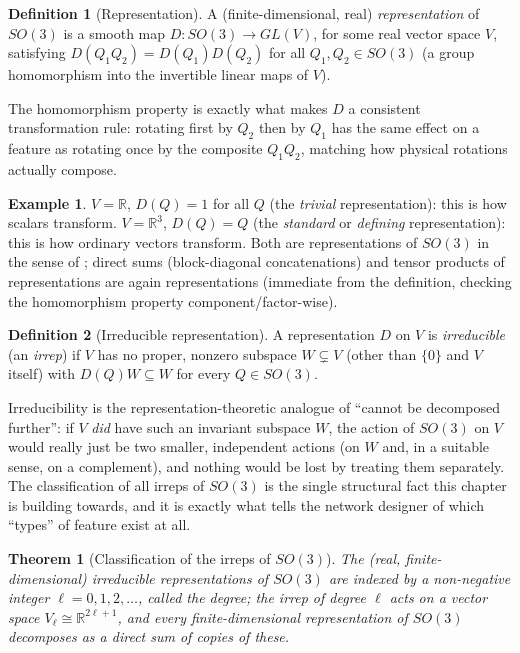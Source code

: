 \documentclass[11pt,a4paper]{report}
\newtheorem{theorem}{Theorem}[chapter]
\theoremstyle{definition}
\newtheorem{definition}[definition]{Definition}
\newtheorem{example}[example]{Example}
\theoremstyle{remark}
\newcommand{\RR}{\mathbb R}
\begin{document}
\begin{definition}[Representation]
\label{def:representation-scratch}
A (finite-dimensional, real) \emph{representation} of $SO(3)$ is a smooth
map $D:SO(3)\to GL(V)$, for some real vector space $V$, satisfying
$D(Q_1Q_2)=D(Q_1)D(Q_2)$ for all $Q_1,Q_2\in SO(3)$ (a group homomorphism
into the invertible linear maps of $V$).
\end{definition}

The homomorphism property is exactly what makes $D$ a consistent
transformation rule: rotating first by $Q_2$ then by $Q_1$ has the same
effect on a feature as rotating once by the composite $Q_1Q_2$, matching
how physical rotations actually compose.

\begin{example}
$V=\RR$, $D(Q)=1$ for all $Q$ (the \emph{trivial} representation): this is
how scalars transform. $V=\RR^3$, $D(Q)=Q$ (the \emph{standard} or
\emph{defining} representation): this is how ordinary vectors transform.
Both are representations of $SO(3)$ in the sense of
; direct sums (block-diagonal
concatenations) and tensor products of representations are again
representations (immediate from the definition, checking the homomorphism
property component/factor-wise).
\end{example}

\begin{definition}[Irreducible representation]
\label{def:irrep-scratch}
A representation $D$ on $V$ is \emph{irreducible} (an \emph{irrep}) if $V$
has no proper, nonzero subspace $W\subsetneq V$ (other than $\{0\}$ and $V$
itself) with $D(Q)W\subseteq W$ for every $Q\in SO(3)$.
\end{definition}

Irreducibility is the representation-theoretic analogue of ``cannot be
decomposed further'': if $V$ \emph{did} have such an invariant subspace $W$,
the action of $SO(3)$ on $V$ would really just be two smaller, independent
actions (on $W$ and, in a suitable sense, on a complement), and nothing
would be lost by treating them separately. The classification of all
irreps of $SO(3)$ is the single structural fact this chapter is building
towards, and it is exactly what tells the network designer of
 which ``types'' of feature exist at all.

\begin{theorem}[Classification of the irreps of $SO(3)$]
\label{thm:so3-irrep-classification}
The (real, finite-dimensional) irreducible representations of $SO(3)$ are
indexed by a non-negative integer $\ell=0,1,2,\dots$, called the
\emph{degree}; the irrep of degree $\ell$ acts on a vector space
$V_\ell\cong\RR^{2\ell+1}$, and every finite-dimensional representation of
$SO(3)$ decomposes as a direct sum of copies of these.
\end{theorem}
\end{document}
